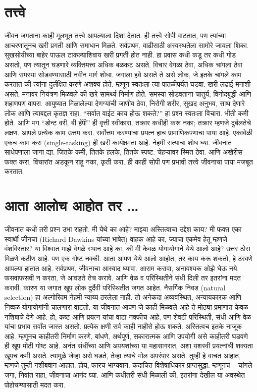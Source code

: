 \section*{तत्त्वे}
जीवन जगताना काही मूलभूत तत्त्वे आपल्याला दिशा देतात. ही तत्त्वे सोपी वाटतात, पण त्यांच्या आचरणातूनच खरी प्रगती आणि समाधान मिळते.
सर्वप्रथम, वाढीसाठी अस्वस्थतेला सामोरे जायला शिका. सुखसोयीच्या बाहेर पाऊल टाकल्याशिवाय खरी प्रगती होत नाही. हा प्रवास कधी कडू तर कधी गोड असतो, पण त्यातून घडणारे व्यक्तिमत्त्व अधिक बळकट असते.
विचार वेगळा ठेवा, अधिक चांगला ठेवा आणि समस्या सोडवण्यासाठी नवीन मार्ग शोधा. जगाला हवे असते ते असे लोक, जे इतके चांगले काम करतात की त्यांना दुर्लक्षित करणे अशक्य होते. म्हणून स्वतःला त्या पातळीपर्यंत घडवा.
खरी लढाई मनाशी असते. मनावर नियंत्रण मिळवले की खरे सामर्थ्य निर्माण होते. समस्या सोडवताना चातुर्य, विनोदबुद्धी आणि शहाणपण वापरा. आयुष्यात मिळालेल्या देणग्यांची जाणीव ठेवा, निरोगी शरीर, सुखद अनुभव, साथ देणारे लोक आणि त्याबद्दल कृतज्ञ राहा.
“सर्वात वाईट काय होऊ शकते?” हा प्रश्न स्वतःला विचारा. भीती कमी होते. आणि मग “डोन्ट वरी, बी हॅपी” ही वृत्ती स्वीकारा. तक्रार कधीही करू नका; तक्रार म्हणजे दुर्बलतेचे लक्षण.
आपले प्रत्येक काम उत्तम करा. सर्वोत्तम करण्याचा प्रयत्न हाच प्रामाणिकपणाचा पाया आहे. एकावेळी एकच काम करा (single-tasking) ही खरी कार्यक्षमता आहे.
नेहमी सत्याचा शोध घ्या. जीवनात साधेपणाला जागा द्या. जितके कमी, तितके हलके, तितके स्पष्ट. चेहऱ्यावर स्मित ठेवा. आणि अखेरीस  फक्त करा. विचारांत अडकून राहू नका, कृती करा.
ही काही सोपी पण प्रभावी तत्त्वे जीवनाचा पाया मजबूत करतात.
\section*{आता आलोच आहोत तर \ldots}
जीवनात कधी तरी प्रश्न उभा राहतो.  मी येथे का आहे? माझ्या अस्तित्वाचा उद्देश काय? मी फक्त एका स्वार्थी जीनचा (Richard Dawkins यांच्या भाषेत) वाहक आहे का, ज्याचा एकमेव हेतू म्हणजे वंशविस्तार? या विश्वात माझे वेगळे स्थान आहे का, की मी केवळ योगायोगाने येथे आलो आहे?
उत्तर ठोस मिळणे कठीण आहे. पण एक गोष्ट नक्की. आता आपण येथे आलो आहोत, तर काय करू शकतो, हे ठरवणे आपल्या हातात आहे.
सर्वप्रथम, जीवनाचा आस्वाद घ्यावा. आराम करावा, अनावश्यक ओझे घेऊ नये. फसवाफसवी न करता, जे आवडते तेच करावे. आणि वेळ व परिस्थितीने संधी दिली तर इतरांना मदत करावी. कारण या जगात खूप लोक दुर्दैवी परिस्थितीत जगत आहेत. नैसर्गिक निवड (natural selection) हा अल्गोरिदम नेहमी न्याय्य ठरलेला नाही. तो अनेकदा अव्यवस्थित, अन्यायकारक आणि निव्वळ योगायोगांनी चालणारा वाटतो.
या जीवनात आपण जे काही मिळवले आहे ते मोठ्या प्रमाणात केवळ नशिबाचे देणे आहे. हो, कष्ट आणि प्रयत्न यांचा वाटा नक्कीच आहे, पण शेवटी परिस्थिती, संधी आणि वेळ यांचा प्रभाव सर्वांत जास्त असतो. प्रत्येक क्षणी सर्व काही नाहीसे होऊ शकते. अस्तित्वच इतके नाजूक आहे.
म्हणूनच काहीतरी निर्माण करणे, बांधणे, अर्थपूर्ण, सकारात्मक आणि उपयोगी असे काहीतरी घडवणे ही खूप मोठी गोष्ट आहे. अनंत संधींच्या आणि अपयशांच्या या महासागरात, अशा यशस्वी प्रयत्नांची शक्यता खूपच कमी असते. त्यामुळे जेव्हा असे घडते, तेव्हा त्याचे मोल अपरंपार असते.
तुम्ही हे वाचत आहात, म्हणजे तुम्ही नशीबवान आहात. होय, फारच भाग्यवान. कदाचित विशेषाधिकार प्राप्तसुद्धा. म्हणूनच – चांगले जगा, निवांत राहा, जीवनाचा आनंद घ्या. आणि कधीतरी संधी मिळाली की, इतरांना देखील या अवस्थेत पोहोचण्यासाठी मदत करा.
